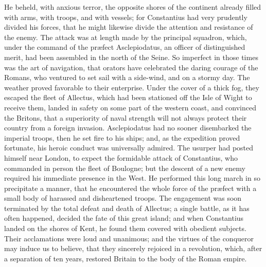 He beheld, with anxious terror, the opposite shores of the
continent already filled with arms, with troops, and with
vessels; for Constantius had very prudently divided his forces,
that he might likewise divide the attention and resistance of the
enemy. The attack was at length made by the principal squadron,
which, under the command of the præfect Asclepiodatus, an officer
of distinguished merit, had been assembled in the north of the
Seine. So imperfect in those times was the art of navigation,
that orators have celebrated the daring courage of the Romans,
who ventured to set sail with a side-wind, and on a stormy day.
The weather proved favorable to their enterprise. Under the cover
of a thick fog, they escaped the fleet of Allectus, which had
been stationed off the Isle of Wight to receive them, landed in
safety on some part of the western coast, and convinced the
Britons, that a superiority of naval strength will not always
protect their country from a foreign invasion. Asclepiodatus had
no sooner disembarked the imperial troops, then he set fire to
his ships; and, as the expedition proved fortunate, his heroic
conduct was universally admired. The usurper had posted himself
near London, to expect the formidable attack of Constantius, who
commanded in person the fleet of Boulogne; but the descent of a
new enemy required his immediate presence in the West. He
performed this long march in so precipitate a manner, that he
encountered the whole force of the præfect with a small body of
harassed and disheartened troops. The engagement was soon
terminated by the total defeat and death of Allectus; a single
battle, as it has often happened, decided the fate of this great
island; and when Constantius landed on the shores of Kent, he
found them covered with obedient subjects. Their acclamations
were loud and unanimous; and the virtues of the conqueror may
induce us to believe, that they sincerely rejoiced in a
revolution, which, after a separation of ten years, restored
Britain to the body of the Roman empire.\footnotemark[31]


